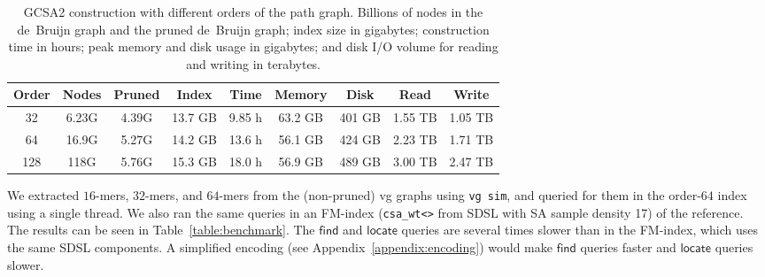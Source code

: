 \documentclass[a4paper,UKenglish]{lipics-v2016}
\newcommand{\find}{\ensuremath{\mathsf{find}}}
\newcommand{\locate}{\ensuremath{\mathsf{locate}}}
\newcommand{\kmer}[1]{$#1$\nobreakdash-mer}
\newcommand{\orderk}[1]{order\nobreakdash-$#1$}
\begin{document}
\begin{table}[t!]
\begin{center}
\caption{GCSA2 construction with different orders of the path graph. Billions of nodes in the de~Bruijn graph and the pruned de~Bruijn graph; index size in gigabytes; construction time in hours; peak memory and disk usage in gigabytes; and disk I/O volume for reading and writing in terabytes.}\label{table:construction}
\begin{tabular}{c|ccc|ccc|cc}
\hline
\textbf{Order} & \textbf{Nodes} & \textbf{Pruned} & \textbf{Index} & \textbf{Time} & \textbf{Memory} & \textbf{Disk} & \textbf{Read} & \textbf{Write} \\
\hline
 32 & 6.23G & 4.39G & 13.7 GB & 9.85 h & 63.2 GB & 401 GB & 1.55 TB & 1.05 TB \\
 64 & 16.9G & 5.27G & 14.2 GB & 13.6 h & 56.1 GB & 424 GB & 2.23 TB & 1.71 TB \\
128 &  118G & 5.76G & 15.3 GB & 18.0 h & 56.9 GB & 489 GB & 3.00 TB & 2.47 TB \\
\hline
\end{tabular}
\end{center}
\end{table}

We extracted \kmer{16}s, \kmer{32}s, and \kmer{64}s from the (non-pruned) vg graphs using \texttt{vg sim}, and queried for them in the \orderk{64} index using a single thread. We also ran the same queries in an FM\nobreakdash-index (\texttt{csa\_wt<>} from SDSL with SA sample density 17) of the reference. The results can be seen in Table~\ref{table:benchmark}. The $\find$ and $\locate$ queries are several times slower than in the FM\nobreakdash-index, which uses the same SDSL components. A simplified encoding (see Appendix~\ref{appendix:encoding}) would make $\find$ queries faster and $\locate$ queries slower.
\end{document}
